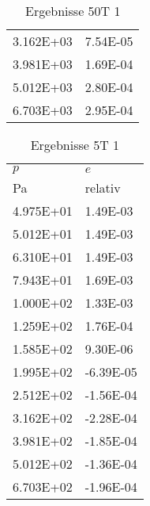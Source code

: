 \begin{table}
\begin{tabular}{l l }
\num{3.162E+03}&\num{7.54E-05}\\
\num{3.981E+03}&\num{1.69E-04}\\
\num{5.012E+03}&\num{2.80E-04}\\
\num{6.703E+03}&\num{2.95E-04}\\
\bottomrule
\end{tabular}\caption{Ergebnisse 50T 1}\end{table}\begin{table}\begin{tabular}{l l }
\toprule
$p$&$e$\\
 Pa & relativ \\\midrule
\num{4.975E+01}&\num{1.49E-03}\\
\num{5.012E+01}&\num{1.49E-03}\\
\num{6.310E+01}&\num{1.49E-03}\\
\num{7.943E+01}&\num{1.69E-03}\\
\num{1.000E+02}&\num{1.33E-03}\\
\num{1.259E+02}&\num{1.76E-04}\\
\num{1.585E+02}&\num{9.30E-06}\\
\num{1.995E+02}&\num{-6.39E-05}\\
\num{2.512E+02}&\num{-1.56E-04}\\
\num{3.162E+02}&\num{-2.28E-04}\\
\num{3.981E+02}&\num{-1.85E-04}\\
\num{5.012E+02}&\num{-1.36E-04}\\
\num{6.703E+02}&\num{-1.96E-04}\\
\bottomrule
\end{tabular}\caption{Ergebnisse 5T 1}\end{table}